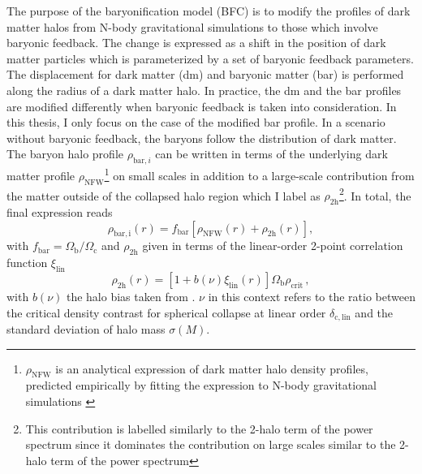 The purpose of the baryonification model (BFC) is to modify the profiles of dark matter halos from N-body gravitational simulations to those which involve baryonic feedback. The change is expressed as a shift in the position of dark matter particles which is parameterized by a set of baryonic feedback parameters. The displacement for dark matter (dm) and baryonic matter (bar) is performed along the radius of a dark matter halo. In practice, the dm and the bar profiles are modified differently when baryonic feedback is taken into consideration. In this thesis, I only focus on the case of the modified bar profile. In a scenario without baryonic feedback, the baryons follow the distribution of dark matter. The baryon halo profile $\rho_{\mathrm{bar}, i}$ can be written in terms of the underlying dark matter profile  $\rho_{\mathrm{NFW}}$\footnote{$\rho_{\mathrm{NFW}}$ is an analytical expression of dark matter halo density profiles, predicted empirically by fitting the expression to N-body gravitational simulations \citep{Navarro_1997}} on small scales in addition to a large-scale contribution from the matter outside of the collapsed halo region which I label as $\rho_{\mathrm{2h}}$\footnote{This contribution is labelled similarly to the 2-halo term of the power spectrum since it dominates the contribution on large scales similar to the 2-halo term of the power spectrum}. In total, the final expression reads
\begin{equation}
    \rho_{\mathrm{bar,i}}(r) = f_{\mathrm{bar}} \left[ \rho_{\mathrm{NFW}}(r) + \rho_{\mathrm{2h}}(r) \right],
\end{equation}
with $f_{\mathrm{bar}}  = \Omega_\mathrm{b}/\Omega_\mathrm{c}$ and $\rho_{\mathrm{2h}}$ given in terms of the linear-order 2-point correlation function $\xi_\mathrm{lin}$
\begin{equation}
    \rho_{\mathrm{2h}}(r) = \left[ 1 + b(\nu)\xi_{\mathrm{lin}}(r) \right] \Omega_{\mathrm{b}} \rho_{\mathrm{crit}} \, ,
\end{equation}
with $b(\nu)$ the halo bias taken from \citet{tinker2010large}. $\nu$ in this context refers to the ratio between the critical density contrast for spherical collapse at linear order $\delta_\mathrm{c, lin}$ and the standard deviation of halo mass $\sigma(M)$.


